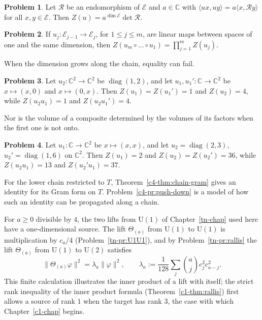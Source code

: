 \documentclass[reqno]{amsart}
\newcounter{chap}
\theoremstyle{definition}
\newtheorem{problem}{Problem}[section]
\theoremstyle{plain}
\newcommand{\C}{\mathbb C}
\begin{document}
\begin{problem}\label{pr:scalar-gram}
Let \(\mathcal R\) be an endomorphism of \(\mathcal E\) and \(a \in \C\) with \(\langle ux, uy\rangle = a \langle x, \mathcal R y\rangle\) for all \(x, y \in \mathcal E\).  Then \(Z(u) = a^{\dim \mathcal E} \det \mathcal R\).
\end{problem}

\begin{problem}\label{pr:square-chain}
If \(u_j \colon \mathcal E_{j-1} \to \mathcal E_j\), for \(1 \le j \le m\), are linear maps between spaces of one and the same dimension, then \(Z(u_m \circ \dots \circ u_1) = \prod_{j=1}^m Z(u_j)\).
\end{problem}

When the dimension grows along the chain, equality can fail.

\begin{problem}\label{pr:position}
Let \(u_2 \colon \C^2 \to \C^2\) be \(\operatorname{diag}(1, 2)\), and let \(u_1, u_1' \colon \C \to \C^2\) be \(x \mapsto (x, 0)\) and \(x \mapsto (0, x)\).  Then \(Z(u_1) = Z(u_1') = 1\) and \(Z(u_2) = 4\), while \(Z(u_2u_1) = 1\) and \(Z(u_2u_1') = 4\).
\end{problem}

Nor is the volume of a composite determined by the volumes of its factors when the first one is not onto.

\begin{problem}\label{pr:not-onto}
Let \(u_1 \colon \C \to \C^2\) be \(x \mapsto (x, x)\), and let \(u_2 = \operatorname{diag}(2, 3)\), \(u_2' = \operatorname{diag}(1, 6)\) on \(\C^2\).  Then \(Z(u_1) = 2\) and \(Z(u_2) = Z(u_2') = 36\), while \(Z(u_2u_1) = 13\) and \(Z(u_2'u_1) = 37\).
\end{problem}

For the lower chain restricted to \(T\), Theorem~\ref{c4-thm:chain-gram} gives an identity for its Gram form on \(T\).  Problem~\ref{c4-pr:push-down} is a model of how such an identity can be propagated along a chain.

For \(a \ge 0\) divisible by \(4\), the two lifts from \(\mathrm U(1)\) of Chapter~\ref{tn-chap} used here have a one-dimensional source.  The lift \(\Theta_{(a)}\) from \(\mathrm U(1)\) to \(\mathrm U(1)\) is multiplication by \(c_a/4\) (Problem~\ref{tn-pr:U1U1}), and by Problem~\ref{tn-pr:rallis} the lift \(\Theta_{(a)}\) from \(\mathrm U(1)\) to \(\mathrm U(2)\) satisfies
\[
  \lVert \Theta_{(a)}\varphi \rVert^2 = \lambda_a \lVert \varphi \rVert^2 , \qquad
  \lambda_a := \frac{1}{128} \sum_j \binom{a}{j} c_j^2 c_{a-j}^2 .
\]
This finite calculation illustrates the inner product of a lift with itself; the strict rank inequality of the inner product formula (Theorem~\ref{c1-thm:rallis}) first allows a source of rank \(1\) when the target has rank \(3\), the case with which Chapter~\ref{c1-chap} begins.
\end{document}
